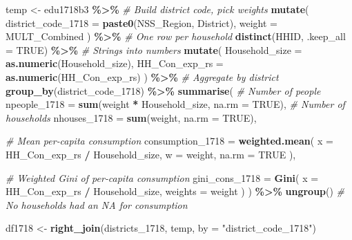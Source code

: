 \documentclass[
]{article}
\newenvironment{Shaded}{\begin{snugshade}}{\end{snugshade}}
\newcommand{\AttributeTok}[1]{\textcolor[rgb]{0.13,0.29,0.53}{#1}}
\newcommand{\CommentTok}[1]{\textcolor[rgb]{0.56,0.35,0.01}{\textit{#1}}}
\newcommand{\ConstantTok}[1]{\textcolor[rgb]{0.56,0.35,0.01}{#1}}
\newcommand{\FunctionTok}[1]{\textcolor[rgb]{0.13,0.29,0.53}{\textbf{#1}}}
\newcommand{\NormalTok}[1]{#1}
\newcommand{\OtherTok}[1]{\textcolor[rgb]{0.56,0.35,0.01}{#1}}
\newcommand{\SpecialCharTok}[1]{\textcolor[rgb]{0.81,0.36,0.00}{\textbf{#1}}}
\newcommand{\StringTok}[1]{\textcolor[rgb]{0.31,0.60,0.02}{#1}}
\begin{document}
\begin{Shaded}
\begin{Highlighting}[]
\NormalTok{temp }\OtherTok{\textless{}{-}}\NormalTok{ edu1718b3 }\SpecialCharTok{\%\textgreater{}\%}
  \CommentTok{\# Build district code, pick weights}
  \FunctionTok{mutate}\NormalTok{(}
    \AttributeTok{district\_code\_1718 =} \FunctionTok{paste0}\NormalTok{(NSS\_Region, District),}
    \AttributeTok{weight =}\NormalTok{ MULT\_Combined}
\NormalTok{  ) }\SpecialCharTok{\%\textgreater{}\%}
  \CommentTok{\# One row per household}
  \FunctionTok{distinct}\NormalTok{(HHID, }\AttributeTok{.keep\_all =} \ConstantTok{TRUE}\NormalTok{) }\SpecialCharTok{\%\textgreater{}\%}
  \CommentTok{\# Strings into numbers}
  \FunctionTok{mutate}\NormalTok{(}
    \AttributeTok{Household\_size =} \FunctionTok{as.numeric}\NormalTok{(Household\_size),}
    \AttributeTok{HH\_Con\_exp\_rs =} \FunctionTok{as.numeric}\NormalTok{(HH\_Con\_exp\_rs)}
\NormalTok{  ) }\SpecialCharTok{\%\textgreater{}\%}
  \CommentTok{\# Aggregate by district}
  \FunctionTok{group\_by}\NormalTok{(district\_code\_1718) }\SpecialCharTok{\%\textgreater{}\%}
  \FunctionTok{summarise}\NormalTok{(}
    \CommentTok{\# Number of people}
    \AttributeTok{npeople\_1718 =} \FunctionTok{sum}\NormalTok{(weight }\SpecialCharTok{*}\NormalTok{ Household\_size, }\AttributeTok{na.rm =} \ConstantTok{TRUE}\NormalTok{),}
    \CommentTok{\# Number of households}
    \AttributeTok{nhouses\_1718 =} \FunctionTok{sum}\NormalTok{(weight, }\AttributeTok{na.rm =} \ConstantTok{TRUE}\NormalTok{),}

    \CommentTok{\# Mean per‑capita consumption}
    \AttributeTok{consumption\_1718 =} \FunctionTok{weighted.mean}\NormalTok{(}
      \AttributeTok{x =}\NormalTok{ HH\_Con\_exp\_rs }\SpecialCharTok{/}\NormalTok{ Household\_size,}
      \AttributeTok{w =}\NormalTok{ weight,}
      \AttributeTok{na.rm =} \ConstantTok{TRUE}
\NormalTok{    ),}

    \CommentTok{\# Weighted Gini of per‑capita consumption}
    \AttributeTok{gini\_cons\_1718 =} \FunctionTok{Gini}\NormalTok{(}
      \AttributeTok{x =}\NormalTok{ HH\_Con\_exp\_rs }\SpecialCharTok{/}\NormalTok{ Household\_size,}
      \AttributeTok{weights =}\NormalTok{ weight}
\NormalTok{    )}
\NormalTok{  ) }\SpecialCharTok{\%\textgreater{}\%}
  \FunctionTok{ungroup}\NormalTok{()}
\CommentTok{\# No households had an NA for consumption}

\NormalTok{df1718 }\OtherTok{\textless{}{-}} \FunctionTok{right\_join}\NormalTok{(districts\_1718, temp, }\AttributeTok{by =} \StringTok{"district\_code\_1718"}\NormalTok{)}




\end{Highlighting}
\end{Shaded}
\end{document}
